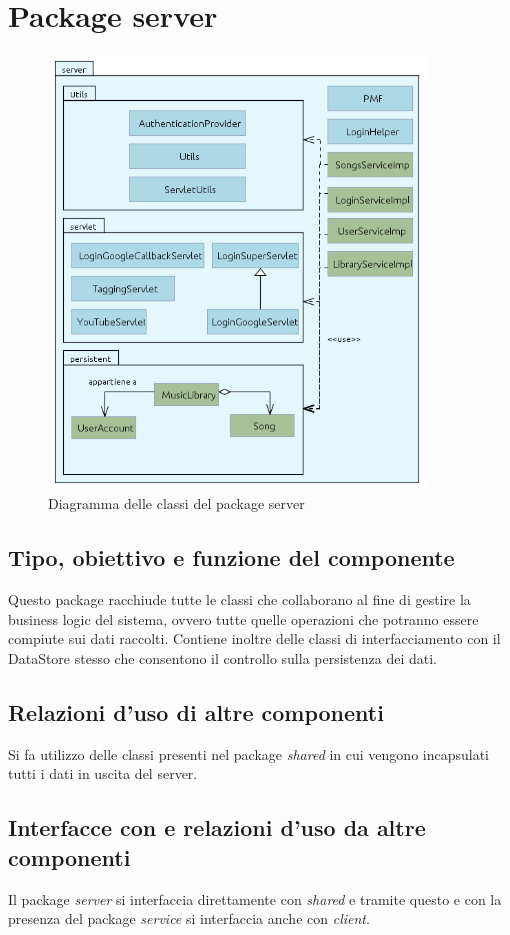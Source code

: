 \section{Package server}
\begin{figure}[h]
  \centering
  \includegraphics[width=10cm]{img/ST/Server.png}
\caption{Diagramma delle classi del package server}
\end{figure}

\subsection*{Tipo, obiettivo e funzione del componente} %
Questo package racchiude tutte le classi che collaborano al fine di gestire la
business logic del sistema, ovvero tutte quelle operazioni che potranno essere
compiute sui dati raccolti. Contiene inoltre delle classi di interfacciamento
con il DataStore stesso che consentono il controllo sulla persistenza dei dati.

\subsection*{Relazioni d'uso di altre componenti}
Si fa utilizzo delle classi presenti nel package \emph{shared} in cui vengono
incapsulati tutti i dati in uscita del server.

\subsection*{Interfacce con e relazioni d'uso da altre componenti}
Il package \emph{server} si interfaccia direttamente con \emph{shared} e tramite
questo e con la presenza del package \emph{service} si interfaccia anche con
\emph{client}.

